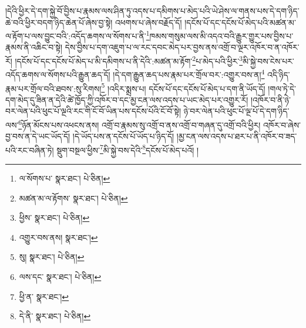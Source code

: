 །དེའི་ཕྱིར་དེ་དག་སྐྱེ་བོ་བྱིས་པ་རྣམས་ལས་ཤིན་ཏུ་འདས་པ་དམིགས་པ་མེད་པའི་ཡེ་ཤེས་ལ་གནས་པས་དེ་དག་ཉིད་ཆེ་བའི་ཕྱིར་བདག་ཉིད་ཆེན་པོ་ཞེས་བྱ་སྟེ། འཕགས་པ་ཞེས་བརྗོད་དོ། །དངོས་པོ་དང་དངོས་པོ་མེད་པའི་མཚན་མ་ལ་རྟོག་པ་ལས་བྱུང་བའི་:འདོད་ཆགས་ལ་སོགས་པ་ནི་\footnote{ལ་སོགས་པ་  སྣར་ཐང་།  པེ་ཅིན། }ཁམས་གསུམ་ལས་མི་འདའ་བའི་རྒྱུར་གྱུར་པས་བྱིས་པ་རྣམས་ནི་འཆིང་བ་སྟེ། དེས་བྱིས་པ་དག་འཇུག་པ་ལ་རང་དབང་མེད་པར་བྱས་ནས་འགྲོ་བ་ལྔར་འཁོར་བ་ན་འཁོར་རོ། །དངོས་པོ་དང་དངོས་པོ་མེད་པ་མི་དམིགས་པ་ནི་དེའི་:མཚན་མ་རྟོག་\footnote{མཚན་མ་ལ་རྟོགས་  སྣར་ཐང་།  པེ་ཅིན། }པ་མེད་པའི་ཕྱིར་\footnote{ཕྱིས་  སྣར་ཐང་།  པེ་ཅིན། }མི་སྐྱེ་བས་ངེས་པར་འདོད་ཆགས་ལ་སོགས་པའི་རྒྱུན་ཆད་དོ། །དེ་དག་རྒྱུན་ཆད་པས་རྣམ་པར་གྲོལ་བར་:འགྱུར་བས་ན།\footnote{འགྱུར་བས་ནས།  སྣར་ཐང་། } འདི་ཉིད་རྣམ་པར་གྲོལ་བའི་ཐབས་:སུ་རིགས།\footnote{སུ།  སྣར་ཐང་།  པེ་ཅིན། } །འདིར་སྨྲས་པ། དངོས་པོ་དང་དངོས་པོ་མེད་པ་དག་ནི་ཡོད་དོ། །གལ་ཏེ་དེ་དག་མེད་དུ་ཟིན་ན་དེའི་ཚེ་ཁྱོད་ཀྱི་འཁོར་བ་དང་མྱ་ངན་ལས་འདས་པ་ཡང་མེད་པར་འགྱུར་རོ། །འཁོར་བ་ནི་ཉེ་བར་ལེན་པའི་ཕུང་པོ་ལྔའི་རང་གི་ངོ་བོ་ཡིན་པས་དངོས་པོའི་ངོ་བོ་སྟེ། ཉེ་བར་ལེན་པའི་ཕུང་པོ་ལྔ་པོ་དེ་དག་ཉིད་ལས་\footnote{ལས་དང་  སྣར་ཐང་།  པེ་ཅིན། }ཉོན་མོངས་པས་འཕངས་ནས། འགྲོ་བ་རྣམས་སུ་འགྲོ་བ་ནས་འགྲོ་བ་གཞན་དུ་འགྲོ་བའི་ཕྱིར། འཁོར་བ་ཞེས་བྱ་བས་ན་དེ་ཡང་ཡོད་དོ། །དེ་ཡོད་པས་ན་དངོས་པོ་ཡོད་པ་ཉིད་དོ། །མྱ་ངན་ལས་འདས་པ་ཐར་པ་ནི་འཁོར་བ་ཟད་པའི་རང་བཞིན་ཏེ། སྡུག་བསྔལ་ཕྱིས་\footnote{ཕྱི་ན་  སྣར་ཐང་། }མི་སྐྱེ་བས་དེའི་\footnote{དེ་ནི་  སྣར་ཐང་།  པེ་ཅིན། }དངོས་པོ་མེད་པའོ། །
